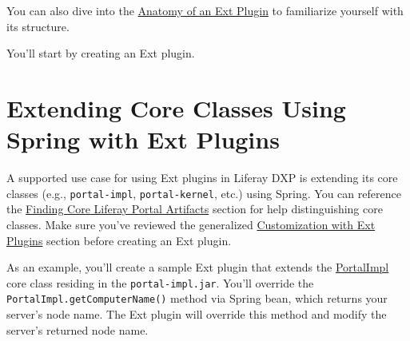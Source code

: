 You can also dive into the
\href{/docs/7-2/customization/-/knowledge_base/c/anatomy-of-an-ext-plugin}{Anatomy
of an Ext Plugin} to familiarize yourself with its structure.

You'll start by creating an Ext plugin.

\chapter{Extending Core Classes Using Spring with Ext
Plugins}\label{extending-core-classes-using-spring-with-ext-plugins}

A supported use case for using Ext plugins in Liferay DXP is extending
its core classes (e.g., \texttt{portal-impl}, \texttt{portal-kernel},
etc.) using Spring. You can reference the
\href{/docs/7-2/customization/-/knowledge_base/c/finding-artifacts\#finding-core-artifact-attributes}{Finding
Core Liferay Portal Artifacts} section for help distinguishing core
classes. Make sure you've reviewed the generalized
\href{/docs/7-2/customization/-/knowledge_base/c/customizing-core-functionality-with-ext}{Customization
with Ext Plugins} section before creating an Ext plugin.

As an example, you'll create a sample Ext plugin that extends the
\href{https://docs.liferay.com/ce/portal/7.2-latest/javadocs/portal-impl/com/liferay/portal/util/PortalImpl.html}{PortalImpl}
core class residing in the \texttt{portal-impl.jar}. You'll override the
\texttt{PortalImpl.getComputerName()} method via Spring bean, which
returns your server's node name. The Ext plugin will override this
method and modify the server's returned node name.

